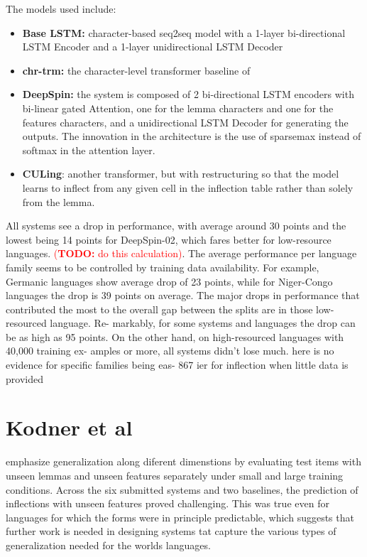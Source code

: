 \documentclass[11pt]{article}
\newcommand{\todo}[1]{\textcolor{red}{(\textbf{TODO:} #1)}}
\begin{document}
The models used include: 
\begin{itemize}
\item \textbf{Base LSTM:} character-based seq2seq model with a 1-layer bi-directional LSTM Encoder and a 1-layer unidirectional LSTM Decoder
\item \textbf{chr-trm:} the character-level transformer baseline of \citet{wu-etal-2021-applying}
\item \textbf{DeepSpin:} the system is composed of 2 bi-directional LSTM encoders with bi-linear gated Attention, one for the lemma characters and one for the features characters, and a unidirectional LSTM Decoder for generating the outputs. The innovation in the architecture is the use of sparsemax \citep{sparsemax} instead of softmax in the attention layer. \citep{peters-martins-2020-one}
\item \textbf{CULing}: another transformer, but with restructuring so that the model learns to inflect from any given cell in the inflection table rather than solely from the lemma. \citep{liu-hulden-2020-leveraging}
\end{itemize}

All systems see a drop in performance, with average around 30 points and the lowest being 14 points for DeepSpin-02, which fares better for low-resource languages. \todo{do this calculation}. 
The average performance per language family seems to be controlled by training data availability. For example, Germanic languages show average drop of 23 points, while for Niger-Congo languages the drop is 39 points on average.
The major drops in performance that contributed the most to the overall gap between the splits are in those low-resourced language. Re- markably, for some systems and languages the drop can be as high as 95 points.
On the other hand, on high-resourced languages with 40,000 training ex- amples or more, all systems didn’t lose much. here is no evidence for specific families being eas-
  867
ier for inflection when little data is provided

\section{Kodner et al}



\citet{kodner-etal-2022-sigmorphon} emphasize generalization along diferent dimenstions by evaluating test items with unseen lemmas and unseen features separately under small and large training conditions. 
Across the six submitted systems and two baselines, the prediction of inflections with unseen features proved challenging. 
This was true even for languages for which the forms were in principle predictable, which suggests that further work is needed in designing systems tat capture the various types of generalization needed for the worlds languages. 
\end{document}
